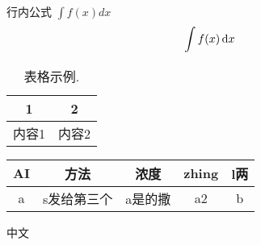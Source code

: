 \documentclass[12pt,a4paper,UTF8]{ctexart}
\begin{document}
行内公式 $\int f(x) dx$
\begin{equation}
    \int f(x) \dif x
    \label{eq:1}
\end{equation}



\begin{table}[htb]
    \centering
    \caption{表格示例.}
    \begin{tabular}{cc}
        \hline
        \hline 1    & 2    \\
        \hline 内容1 & 内容2 \\
        \hline
    \end{tabular}
\end{table}

\begin{table}[htb]
    \begin{tabular}{@{}ccccc@{}}
    \toprule
    AI & 方法     & 浓度   & zhing & l两 \\ \midrule
    a  & s发给第三个 & a是的撒 & a2    & b  \\ \bottomrule
    \end{tabular}
\end{table}

中文


% 
% 
\end{document}
